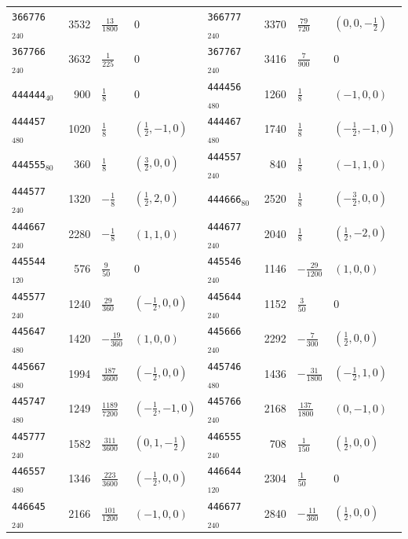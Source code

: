 {\begin{longtable}{@{}lrll@{\hspace{2em}}lrll@{}}
\texttt{366776}$_{240}$ & 3532 & $\tfrac{13}{1800}$ & 0 & \texttt{366777}$_{240}$ & 3370 & $\tfrac{79}{720}$ & $(0,0,-\tfrac{1}{2})$\\
\texttt{367766}$_{240}$ & 3632 & $\tfrac{1}{225}$ & 0 & \texttt{367767}$_{240}$ & 3416 & $\tfrac{7}{900}$ & 0\\
\texttt{444444}$_{40}$ & 900 & $\tfrac{1}{8}$ & 0 & \texttt{444456}$_{480}$ & 1260 & $\tfrac{1}{8}$ & $(-1,0,0)$\\
\texttt{444457}$_{480}$ & 1020 & $\tfrac{1}{8}$ & $(\tfrac{1}{2},-1,0)$ & \texttt{444467}$_{480}$ & 1740 & $\tfrac{1}{8}$ & $(-\tfrac{1}{2},-1,0)$\\
\texttt{444555}$_{80}$ & 360 & $\tfrac{1}{8}$ & $(\tfrac{3}{2},0,0)$ & \texttt{444557}$_{240}$ & 840 & $\tfrac{1}{8}$ & $(-1,1,0)$\\
\texttt{444577}$_{240}$ & 1320 & $-\tfrac{1}{8}$ & $(\tfrac{1}{2},2,0)$ & \texttt{444666}$_{80}$ & 2520 & $\tfrac{1}{8}$ & $(-\tfrac{3}{2},0,0)$\\
\texttt{444667}$_{240}$ & 2280 & $-\tfrac{1}{8}$ & $(1,1,0)$ & \texttt{444677}$_{240}$ & 2040 & $\tfrac{1}{8}$ & $(\tfrac{1}{2},-2,0)$\\
\texttt{445544}$_{120}$ & 576 & $\tfrac{9}{50}$ & 0 & \texttt{445546}$_{240}$ & 1146 & $-\tfrac{29}{1200}$ & $(1,0,0)$\\
\texttt{445577}$_{240}$ & 1240 & $\tfrac{29}{360}$ & $(-\tfrac{1}{2},0,0)$ & \texttt{445644}$_{240}$ & 1152 & $\tfrac{3}{50}$ & 0\\
\texttt{445647}$_{480}$ & 1420 & $-\tfrac{19}{360}$ & $(1,0,0)$ & \texttt{445666}$_{240}$ & 2292 & $-\tfrac{7}{300}$ & $(\tfrac{1}{2},0,0)$\\
\texttt{445667}$_{480}$ & 1994 & $\tfrac{187}{3600}$ & $(-\tfrac{1}{2},0,0)$ & \texttt{445746}$_{480}$ & 1436 & $-\tfrac{31}{1800}$ & $(-\tfrac{1}{2},1,0)$\\
\texttt{445747}$_{480}$ & 1249 & $\tfrac{1189}{7200}$ & $(-\tfrac{1}{2},-1,0)$ & \texttt{445766}$_{240}$ & 2168 & $\tfrac{137}{1800}$ & $(0,-1,0)$\\
\texttt{445777}$_{240}$ & 1582 & $\tfrac{311}{3600}$ & $(0,1,-\tfrac{1}{2})$ & \texttt{446555}$_{240}$ & 708 & $\tfrac{1}{150}$ & $(\tfrac{1}{2},0,0)$\\
\texttt{446557}$_{480}$ & 1346 & $\tfrac{223}{3600}$ & $(-\tfrac{1}{2},0,0)$ & \texttt{446644}$_{120}$ & 2304 & $\tfrac{1}{50}$ & 0\\
\texttt{446645}$_{240}$ & 2166 & $\tfrac{101}{1200}$ & $(-1,0,0)$ & \texttt{446677}$_{240}$ & 2840 & $-\tfrac{11}{360}$ & $(\tfrac{1}{2},0,0)$\\

\end{longtable}}

